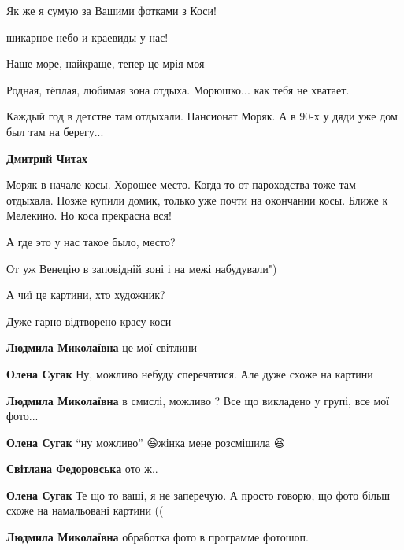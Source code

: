  
 
 
 
 

\qqSecCmt


Як же я сумую за Вашими фотками з Коси!


шикарное небо и краевиды у нас!


Наше море, найкраще, тепер це мрія моя 💙💙💙


Родная, тёплая, любимая зона отдыха. Морюшко... как тебя не хватает.


Каждый год в детстве там отдыхали. Пансионат Моряк. А в 90-х у дяди уже дом был
там на берегу...

\begin{itemize} %
\textbf{Дмитрий Читах} 

Моряк в начале косы. Хорошее место. Когда то от пароходства тоже там отдыхала.
Позже купили домик, только уже почти на окончании косы. Ближе к Мелекино. Но
коса прекрасна вся!

\end{itemize} %



А где это у нас такое было, место?


От уж Венецію в заповідній зоні і на межі набудували")


А чиї це картини, хто художник?

Дуже гарно відтворено красу коси

\begin{itemize} %
\textbf{Людмила Миколаївна} це мої світлини

\textbf{Олена Сугак} Ну, можливо небуду сперечатися. Але дуже схоже на картини

\textbf{Людмила Миколаївна} в смислі, можливо ? Все що викладено у групі, все мої фото...

\textbf{Олена Сугак} \enquote{ну можливо} 😆жінка мене розсмішила 😆

\textbf{Світлана Федоровська} ото ж..

\textbf{Олена Сугак} Те що то ваші, я не заперечую. А просто говорю, що фото більш схоже на намальовані картини ((

\textbf{Людмила Миколаївна} обработка фото в программе фотошоп.
\end{itemize} %

